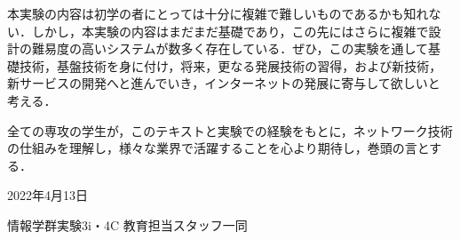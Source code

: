 本実験の内容は初学の者にとっては十分に複雑で難しいものであるかも知れな
い．しかし，本実験の内容はまだまだ基礎であり，この先にはさらに複雑で設
計の難易度の高いシステムが数多く存在している．ぜひ，この実験を通して基
礎技術，基盤技術を身に付け，将来，更なる発展技術の習得，および新技術，
新サービスの開発へと進んでいき，インターネットの発展に寄与して欲しいと
考える．

全ての専攻の学生が，このテキストと実験での経験をもとに，ネットワーク技術
の仕組みを理解し，様々な業界で活躍することを心より期待し，巻頭の言とする．

\begin{flushright}
 2022年4月13日

 情報学群実験3i・4C 教育担当スタッフ一同
\end{flushright}
